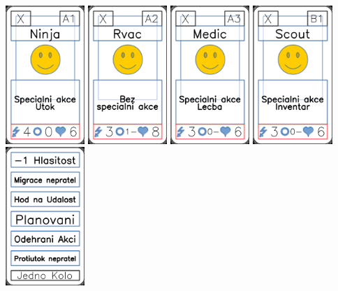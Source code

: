 \documentclass[a4paper]{article}
\begin{document}
	\includegraphics[width=3.0cm]{img-4_0}
	\includegraphics[width=3.0cm]{img-4_1}
	\includegraphics[width=3.0cm]{img-4_2}
	\includegraphics[width=3.0cm]{img-4_3}
	\includegraphics[width=3.0cm]{img-5_0}
\end{document}
